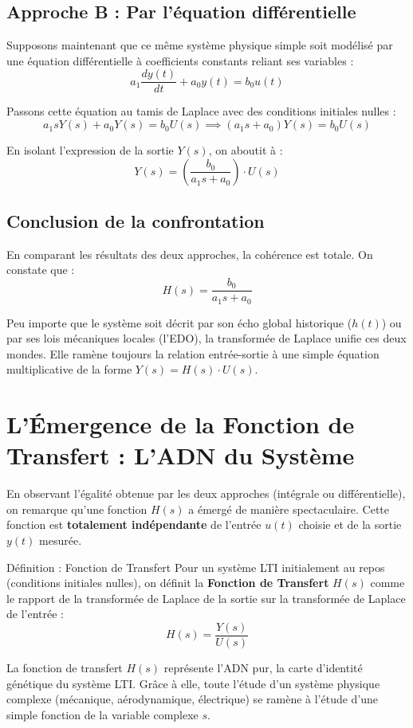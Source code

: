 \documentclass[11pt,a4paper]{report}
\begin{document}
\subsection{Approche B : Par l'équation différentielle}
Supposons maintenant que ce même système physique simple soit modélisé par une équation différentielle à coefficients constants reliant ses variables :
\[ a_1 \frac{dy(t)}{dt} + a_0 y(t) = b_0 u(t) \]

Passons cette équation au tamis de Laplace avec des conditions initiales nulles :
\[ a_1 s Y(s) + a_0 Y(s) = b_0 U(s) \implies (a_1 s + a_0) Y(s) = b_0 U(s) \]

En isolant l'expression de la sortie $Y(s)$, on aboutit à :
\[ Y(s) = \left( \frac{b_0}{a_1 s + a_0} \right) \cdot U(s) \]

\subsection{Conclusion de la confrontation}
En comparant les résultats des deux approches, la cohérence est totale. On constate que :
\[ H(s) = \frac{b_0}{a_1 s + a_0} \]

Peu importe que le système soit décrit par son écho global historique ($h(t)$) ou par ses lois mécaniques locales (l'EDO), la transformée de Laplace unifie ces deux mondes. Elle ramène toujours la relation entrée-sortie à une simple équation multiplicative de la forme $Y(s) = H(s) \cdot U(s)$.
\section{L'Émergence de la Fonction de Transfert : L'ADN du Système}

En observant l'égalité obtenue par les deux approches (intégrale ou différentielle), on remarque qu'une fonction $H(s)$ a émergé de manière spectaculaire. Cette fonction est \textbf{totalement indépendante} de l'entrée $u(t)$ choisie et de la sortie $y(t)$ mesurée. 

\begin{defbox}{Définition : Fonction de Transfert}
    Pour un système LTI initialement au repos (conditions initiales nulles), on définit la \textbf{Fonction de Transfert} $H(s)$ comme le rapport de la transformée de Laplace de la sortie sur la transformée de Laplace de l'entrée :
    \[ H(s) = \frac{Y(s)}{U(s)} \]
\end{defbox}

La fonction de transfert $H(s)$ représente l'ADN pur, la carte d'identité génétique du système LTI. Grâce à elle, toute l'étude d'un système physique complexe (mécanique, aérodynamique, électrique) se ramène à l'étude d'une simple fonction de la variable complexe $s$. 
\end{document}
